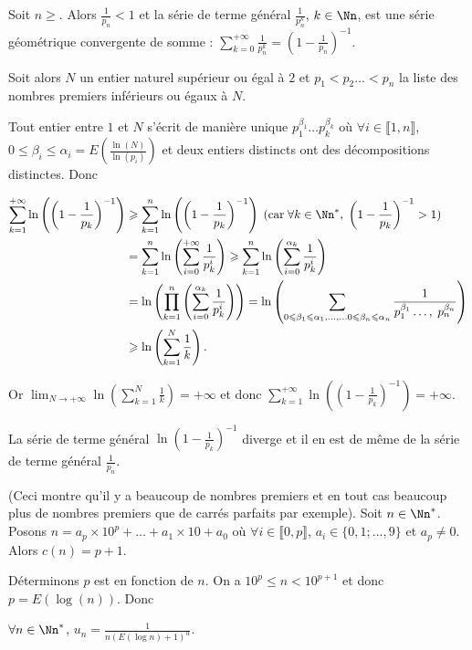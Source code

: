 {{Soit $n\geqslant$. Alors $\frac{1}{p_n}<1$ et la série de terme général $\frac{1}{p_n^k}$, $k\in\Nn$, est une série géométrique convergente de somme : $\sum_{k=0}^{+\infty}\frac{1}{p_n^k}= \left(1-\frac{1}{p_n}\right)^{-1}$.

Soit alors $N$ un entier naturel supérieur ou égal à $2$ et $p_1 < p_2... < p_n$ la liste des nombres premiers inférieurs ou égaux à $N$.

Tout entier entre $1$ et $N$ s'écrit de manière unique $p_1^{\beta_1}\ldots p_k^{\beta_k}$ où $\forall i\in\llbracket1,n\rrbracket$, $0\leqslant\beta_i\leqslant\alpha_i=E\left(\frac{\ln(N)}{\ln(p_i)}\right)$ et deux entiers distincts ont des décompositions distinctes. Donc

\begin{align*}\ensuremath
\sum_{k=1}^{+\infty}\ln\left(\left(1-\frac{1}{p_k}\right)^{-1}\right)&\geqslant\sum_{k=1}^{n}\ln\left(\left(1-\frac{1}{p_k}\right)^{-1}\right)\;(\text{car}\;\forall k\in\Nn^*,\;\left(1-\frac{1}{p_k}\right)^{-1}> 1)\\
 &=\sum_{k=1}^{n}\ln\left(\sum_{i=0}^{+\infty}\frac{1}{p_k^i}\right)\geqslant\sum_{k=1}^{n}\ln\left(\sum_{i=0}^{\alpha_k}\frac{1}{p_k^i}\right)\\
  &=\ln\left(\prod_{k=1}^{n}\left(\sum_{i=0}^{\alpha_k}\frac{1}{p_k^i}\right)\right)=\ln\left(\sum_{0\leqslant\beta_1\leqslant\alpha_1,\ldots,\ldots0\leqslant\beta_n\leqslant\alpha_n}^{}\frac{1}{p_1^{\beta_1}\ldots,\;p_n^{\beta_n}}\right)\\
   &\geqslant\ln\left(\sum_{k=1}^{N}\frac{1}{k}\right).
\end{align*}

Or $\lim_{N \rightarrow +\infty}\ln\left(\sum_{k=1}^{N}\frac{1}{k}\right)=+\infty$ et donc $\sum_{k=1}^{+\infty}\ln\left(\left(1-\frac{1}{p_k}\right)^{-1}\right)=+\infty$.

La série de terme général $\ln\left(1-\frac{1}{p_k}\right)^{-1}$ diverge et il en est de même de la série de terme général $\frac{1}{p_n}$.

(Ceci montre qu'il y a beaucoup de nombres premiers et en tout cas beaucoup plus de nombres premiers que de carrés parfaits par exemple).
Soit $n\in\Nn^*$. Posons $n =a_p\times10^p+\ldots+a_1\times10+a_0$ où $\forall i\in\llbracket0,p\rrbracket$, $a_i\in\{0,1;...,9\}$ et $a_p\neq 0$. Alors $c(n) = p+1$.

Déterminons $p$ est  en fonction de $n$. On a $10^p\leqslant n <10^{p+1}$ et donc $p=E\left(\log(n)\right)$. Donc

\begin{center}
$\forall n\in\Nn^*$, $u_n=\frac{1}{n(E(\log n)+1)^\alpha}$.
\end{center}

}}
